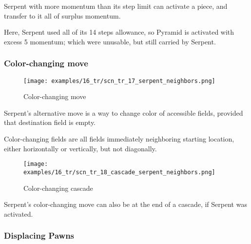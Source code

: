 Serpent with more momentum than its step limit can activate a piece, and
transfer to it all of surplus momentum.

Here, Serpent used all of its 14 steps allowance, so Pyramid is activated with
excess 5 momentum; which were unusable, but still carried by Serpent.

\clearpage %

\subsubsection*{Color-changing move}
\label{sec:Tamoanchan Revisited/Serpent/Movement/Color-changing move}

\noindent
\begin{minipage}{\textwidth}
\begin{wrapfigure}[9]{l}{0.4\textwidth}
\centering
\texttt{[image: examples/16\_tr/scn\_tr\_17\_serpent\_neighbors.png]}
\caption{Color-changing move}
\label{fig:scn_tr_17_serpent_neighbors}
\end{wrapfigure}
Serpent's alternative move is a way to change color of accessible fields,
provided that destination field is empty.

\mbox{}\newline %
Color-changing fields are all fields immediately neighboring starting
location, either horizontally or vertically, but not diagonally.
\end{minipage}

\vspace*{2.9\baselineskip}
\noindent
\begin{minipage}{\textwidth}
\begin{wrapfigure}[3]{l}{0.4\textwidth}
\centering
\texttt{[image: examples/16\_tr/scn\_tr\_18\_cascade\_serpent\_neighbors.png]}
\caption{Color-changing cascade}
\label{fig:scn_tr_18_cascade_serpent_neighbors}
\end{wrapfigure}
Serpent's color-changing move can also be at the end of a cascade,
if Serpent was activated.
\end{minipage}

\clearpage %

\subsubsection*{Displacing Pawns}
\label{sec:Tamoanchan Revisited/Serpent/Movement/Displacing Pawns}


